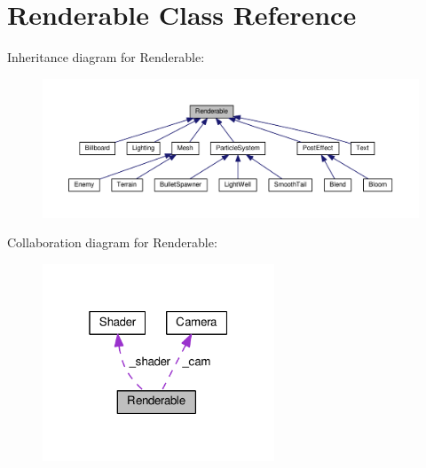 \hypertarget{class_renderable}{}\section{Renderable Class Reference}
\label{class_renderable}


Inheritance diagram for Renderable\+:\nopagebreak
\begin{figure}[H]
\begin{center}
\leavevmode
\includegraphics[width=350pt]{class_renderable__inherit__graph}
\end{center}
\end{figure}


Collaboration diagram for Renderable\+:\nopagebreak
\begin{figure}[H]
\begin{center}
\leavevmode
\includegraphics[width=196pt]{class_renderable__coll__graph}
\end{center}
\end{figure}
